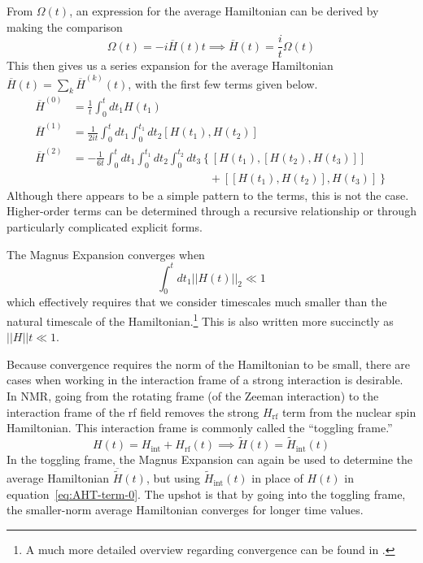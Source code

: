 From $\Omega(t)$, an expression for the average Hamiltonian can be derived by making the comparison
\begin{equation}
    \Omega(t) = -i \overline{H}(t) t \implies \overline{H}(t) = \frac{i}{t} \Omega(t)
\end{equation}
This then gives us a series expansion for the average Hamiltonian $\overline{H}(t) = \sum_k \overline{H}^{(k)}(t)$, with the first few terms given below.
\begin{align}
    \label{eq:AHT-term-0}
    \overline{H}^{(0)} &= \frac{1}{t} \int_0^{t} dt_1 H(t_1) \\
    \label{eq:AHT-term-1}
    \overline{H}^{(1)} &= \frac{1}{2it} \int_0^{t} dt_1 \int_0^{t_1} dt_2
        \left[H(t_1), H(t_2)\right] \\
    \label{eq:AHT-term-2}
    \overline{H}^{(2)} &= -\frac{1}{6t}
    \int_0^{t} dt_1 \int_0^{t_1} dt_2 \int_0^{t_2} dt_3
    \left\{
    \left[H(t_1), \left[H(t_2), H(t_3)\right]\right] \right. \\
    \nonumber
    & \hspace{12em} + \left.
    \left[\left[H(t_1), H(t_2)\right], H(t_3)\right]
    \right\}
\end{align}
Although there appears to be a simple pattern to the terms, this is not the case. Higher-order terms can be determined through a recursive relationship or through particularly complicated explicit forms.

The Magnus Expansion converges when
\begin{equation}\label{eq:AHT-convergence}
    \int_0^t dt_1 ||H(t)||_2 \ll 1
\end{equation}
which effectively requires that we consider timescales much smaller than the natural timescale of the Hamiltonian.\footnote{A much more detailed overview regarding convergence can be found in \cite{Blanes_2009}.} This is also written more succinctly as $||H||t \ll 1$.

Because convergence requires the norm of the Hamiltonian to be small, there are cases when working in the interaction frame of a strong interaction is desirable. In NMR, going from the rotating frame (of the Zeeman interaction) to the interaction frame of the rf field removes the strong $H_\text{rf}$ term from the nuclear spin Hamiltonian. This interaction frame is commonly called the ``toggling frame.''
\begin{equation}
    H(t) = H_{\text{int}} + H_{\text{rf}}(t) \implies \widetilde{H}(t) = \widetilde{H}_{\text{int}}(t)
\end{equation}
In the toggling frame, the Magnus Expansion can again be used to determine the average Hamiltonian $\overline{\widetilde{H}}(t)$, but using $\widetilde{H}_{\text{int}}(t)$ in place of $H(t)$ in equation~\ref{eq:AHT-term-0}. The upshot is that by going into the toggling frame, the smaller-norm average Hamiltonian converges for longer time values.

